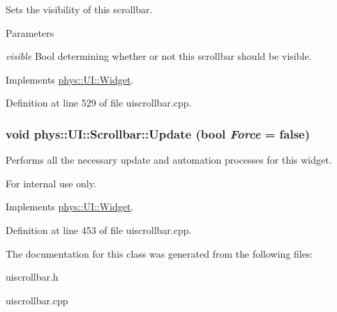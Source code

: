 Sets the visibility of this scrollbar. 


\begin{DoxyParams}{Parameters}
\item[{\em visible}]Bool determining whether or not this scrollbar should be visible. \end{DoxyParams}


Implements \hyperlink{classphys_1_1UI_1_1Widget_ab049233d8d5522a6ab42654b8924a3e0}{phys::UI::Widget}.



Definition at line 529 of file uiscrollbar.cpp.

\hypertarget{classphys_1_1UI_1_1Scrollbar_a628999b4caa32f3c273d45e64d5c62a0}{
\subsubsection[{Update}]{\setlength{\rightskip}{0pt plus 5cm}void phys::UI::Scrollbar::Update (bool {\em Force} = {\ttfamily false})}}
\label{d0/d3e/classphys_1_1UI_1_1Scrollbar_a628999b4caa32f3c273d45e64d5c62a0}


Performs all the necessary update and automation processes for this widget. 

\begin{DoxyInternal}{For internal use only.}
\end{DoxyInternal}


Implements \hyperlink{classphys_1_1UI_1_1Widget_a1806425fcd684c2f0d50cd0ef4a6b0da}{phys::UI::Widget}.



Definition at line 453 of file uiscrollbar.cpp.



The documentation for this class was generated from the following files:\begin{DoxyCompactItemize}
\item 
uiscrollbar.h\item 
uiscrollbar.cpp\end{DoxyCompactItemize}
